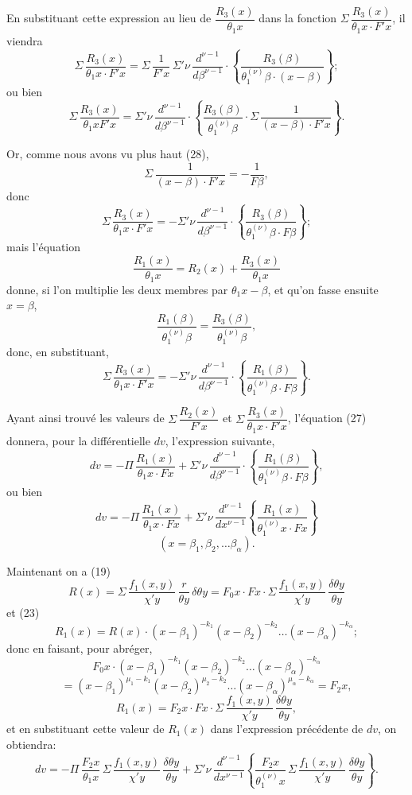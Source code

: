 \documentclass{article}
\begin{document}
En substituant cette expression au lieu de $\dfrac{R_3(x)}{\theta_1 x}$ dans la fonction $\Sigma\,\dfrac{R_3(x)}{\theta_1 x \cdot F' x}$, il viendra
\[ \Sigma\,\frac{R_3(x)}{\theta_1 x \cdot F' x} = \Sigma\,\frac{1}{F' x}\,\Sigma' \nu\,\frac{d^{\nu-1}}{d\beta^{\nu-1}} \cdot \left\{ \frac{R_3(\beta)}{\theta_1^{(\nu)}\beta \cdot (x-\beta)} \right\}; \tag{30} \]
ou bien
\[ \Sigma\,\frac{R_3(x)}{\theta_1 x F' x} = \Sigma' \nu\,\frac{d^{\nu-1}}{d\beta^{\nu-1}} \cdot \left\{ \frac{R_3(\beta)}{\theta_1^{(\nu)}\beta} \cdot \Sigma\,\frac{1}{(x-\beta) \cdot F' x} \right\}. \tag{31} \]

Or, comme nous avons vu plus haut (28),
\[ \Sigma\,\frac{1}{(x-\beta) \cdot F' x} = -\frac{1}{F\beta}, \]
donc
\[ \Sigma\,\frac{R_3(x)}{\theta_1 x \cdot F' x} = -\Sigma' \nu\,\frac{d^{\nu-1}}{d\beta^{\nu-1}} \cdot \left\{ \frac{R_3(\beta)}{\theta_1^{(\nu)}\beta \cdot F\beta} \right\}; \]
mais l'équation
\[ \frac{R_1(x)}{\theta_1 x} = R_2(x) + \frac{R_3(x)}{\theta_1 x} \]
donne, si l'on multiplie les deux membres par $\theta_1 x - \beta$, et qu'on fasse ensuite $x = \beta$,
\[ \frac{R_1(\beta)}{\theta_1^{(\nu)}\beta} = \frac{R_3(\beta)}{\theta_1^{(\nu)}\beta}, \]
donc, en substituant,
\[ \Sigma\,\frac{R_3(x)}{\theta_1 x \cdot F' x} = -\Sigma' \nu\,\frac{d^{\nu-1}}{d\beta^{\nu-1}} \cdot \left\{ \frac{R_1(\beta)}{\theta_1^{(\nu)}\beta \cdot F\beta} \right\}. \tag{32} \]

Ayant ainsi trouvé les valeurs de $\Sigma\,\dfrac{R_2(x)}{F' x}$ et $\Sigma\,\dfrac{R_3(x)}{\theta_1 x \cdot F' x}$, l'équation (27) donnera, pour la différentielle $dv$, l'expression suivante,
\[ dv = -\Pi\,\frac{R_1(x)}{\theta_1 x \cdot F x} + \Sigma' \nu\,\frac{d^{\nu-1}}{d\beta^{\nu-1}} \cdot \left\{ \frac{R_1(\beta)}{\theta_1^{(\nu)}\beta \cdot F\beta} \right\}, \tag{33} \]
ou bien
\[ dv = -\Pi\,\frac{R_1(x)}{\theta_1 x \cdot F x} + \Sigma' \nu\,\frac{d^{\nu-1}}{dx^{\nu-1}} \left\{ \frac{R_1(x)}{\theta_1^{(\nu)} x \cdot F x} \right\} \tag{34} \]
\[ (x = \beta_1, \beta_2, \ldots \beta_\alpha). \]

Maintenant on a (19)
\[ R(x) = \Sigma\,\frac{f_1(x, y)}{\chi' y}\,\frac{r}{\theta y}\,\delta\theta y = F_0 x \cdot F x \cdot \Sigma\,\frac{f_1(x, y)}{\chi' y}\,\frac{\delta\theta y}{\theta y} \]
et (23)
\[ R_1(x) = R(x) \cdot (x-\beta_1)^{-k_1}(x-\beta_2)^{-k_2} \ldots (x-\beta_\alpha)^{-k_\alpha}; \]
donc en faisant, pour abréger,
\[ F_0 x \cdot (x-\beta_1)^{-k_1}(x-\beta_2)^{-k_2} \ldots (x-\beta_\alpha)^{-k_\alpha} \]
\[ = (x-\beta_1)^{\mu_1-k_1}(x-\beta_2)^{\mu_2-k_2} \ldots (x-\beta_\alpha)^{\mu_\alpha-k_\alpha} = F_2 x, \tag{35} \]
\[ R_1(x) = F_2 x \cdot F x \cdot \Sigma\,\frac{f_1(x, y)}{\chi' y}\,\frac{\delta\theta y}{\theta y}, \]
et en substituant cette valeur de $R_1(x)$ dans l'expression précédente de $dv$, on obtiendra:
\[ dv = -\Pi\,\frac{F_2 x}{\theta_1 x}\,\Sigma\,\frac{f_1(x, y)}{\chi' y}\,\frac{\delta\theta y}{\theta y} + \Sigma' \nu\,\frac{d^{\nu-1}}{dx^{\nu-1}} \left\{ \frac{F_2 x}{\theta_1^{(\nu)} x}\,\Sigma\,\frac{f_1(x, y)}{\chi' y}\,\frac{\delta\theta y}{\theta y} \right\}. \tag{36} \]
\end{document}
